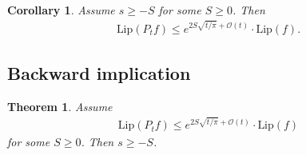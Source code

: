 \documentclass[a4paper,12pt]{article}
\theoremstyle{plain}
\newtheorem{theorem}[thm]{Theorem}
\newtheorem{corollary}[thm]{Corollary}
\begin{document}
\begin{corollary}
Assume $s\ge -S$ for some $S\ge0$. Then
\begin{align}
\text{Lip}  ( P_{t}f)\le e^{2S \sqrt{t/\pi}  + \mathcal{O}(t)}\cdot   \text{Lip} (f).
\end{align}
\end{corollary}


\subsection{Backward implication}

\begin{theorem}
Assume 
\begin{align}\label{grad-ass}
\text{Lip} ( P_{t}f)\le e^{2S \sqrt{t/\pi}  + \mathcal{O}(t)}\cdot   \text{Lip} (f)
\end{align}
 for some $S\ge0$.
Then $s\ge -S$.
\end{theorem} 
\end{document}
